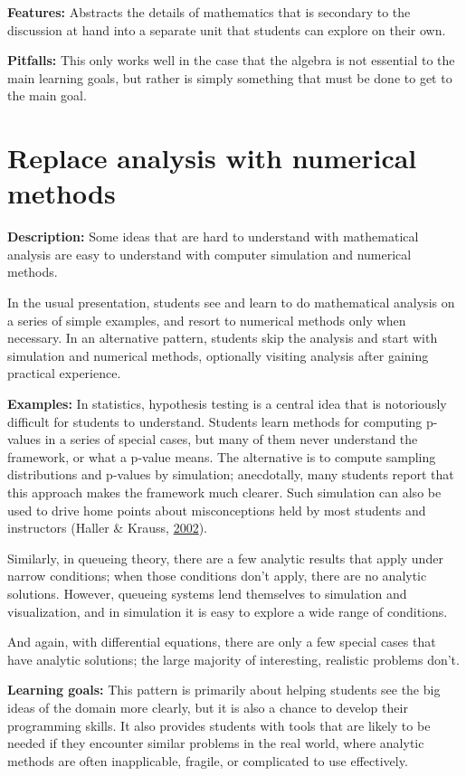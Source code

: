 \documentclass[]{book}
\begin{document}
\textbf{Features:} Abstracts the details of mathematics that is
secondary to the discussion at hand into a separate unit that students
can explore on their own.

\textbf{Pitfalls:} This only works well in the case that the algebra is
not essential to the main learning goals, but rather is simply something
that must be done to get to the main goal.

\section{Replace analysis with numerical
methods}\label{replace-analysis-with-numerical-methods}

\textbf{Description:} Some ideas that are hard to understand with
mathematical analysis are easy to understand with computer simulation
and numerical methods.

In the usual presentation, students see and learn to do mathematical
analysis on a series of simple examples, and resort to numerical methods
only when necessary. In an alternative pattern, students skip the
analysis and start with simulation and numerical methods, optionally
visiting analysis after gaining practical experience.

\textbf{Examples:} In statistics, hypothesis testing is a central idea
that is notoriously difficult for students to understand. Students learn
methods for computing p-values in a series of special cases, but many of
them never understand the framework, or what a p-value means. The
alternative is to compute sampling distributions and p-values by
simulation; anecdotally, many students report that this approach makes
the framework much clearer. Such simulation can also be used to drive
home points about misconceptions held by most students and instructors
(Haller \& Krauss, \protect\hyperlink{ref-HallerKrauss2002}{2002}).

Similarly, in queueing theory, there are a few analytic results that
apply under narrow conditions; when those conditions don't apply, there
are no analytic solutions. However, queueing systems lend themselves to
simulation and visualization, and in simulation it is easy to explore a
wide range of conditions.

And again, with differential equations, there are only a few special
cases that have analytic solutions; the large majority of interesting,
realistic problems don't.

\textbf{Learning goals:} This pattern is primarily about helping
students see the big ideas of the domain more clearly, but it is also a
chance to develop their programming skills. It also provides students
with tools that are likely to be needed if they encounter similar
problems in the real world, where analytic methods are often
inapplicable, fragile, or complicated to use effectively.
\end{document}
